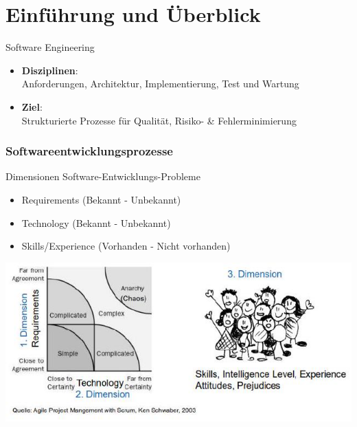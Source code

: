 \section{Einführung und Überblick}

\begin{definition}{Software Engineering}
\begin{itemize}
    \item \textbf{Disziplinen}: \\
    Anforderungen, Architektur, Implementierung, Test und Wartung
    \item \textbf{Ziel}: \\
    Strukturierte Prozesse für Qualität, Risiko- \& Fehlerminimierung
\end{itemize}
\end{definition}



\subsubsection{Softwareentwicklungsprozesse}

\begin{theorem}{Dimensionen Software-Entwicklungs-Probleme}
  \begin{itemize}
    \item Requirements (Bekannt - Unbekannt)
    \item Technology (Bekannt - Unbekannt)
    \item Skills/Experience (Vorhanden - Nicht vorhanden)
\end{itemize}
  \includegraphics[width=\linewidth]{images/2024_12_29_0d1d7b5551ea1b4b41bdg-01}
\end{theorem}


